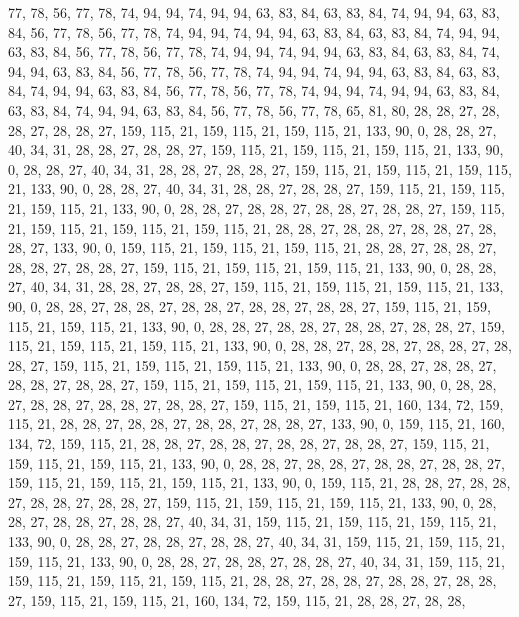 77, 78, 56, 77, 78, 74, 94, 94, 74, 94, 94, 63, 83, 84, 63, 83, 84, 74, 94, 94, 63, 83, 84, 56, 77, 78, 56, 77, 78, 74, 94, 94, 74, 94, 94, 63, 83, 84, 63, 83, 84, 74, 94, 94, 63, 83, 84, 56, 77, 78, 56, 77, 78, 74, 94, 94, 74, 94, 94, 63, 83, 84, 63, 83,
84, 74, 94, 94, 63, 83, 84, 56, 77, 78, 56, 77, 78, 74, 94, 94, 74, 94, 94, 63, 83, 84, 63, 83, 84, 74, 94, 94, 63, 83, 84, 56, 77, 78, 56, 77, 78, 74, 94, 94, 74, 94, 94, 63, 83, 84, 63, 83, 84, 74, 94, 94, 63, 83, 84, 56, 77, 78, 56, 77, 78, 65, 81, 80,
28, 28, 27, 28, 28, 27, 28, 28, 27, 159, 115, 21, 159, 115, 21, 159, 115, 21, 133, 90, 0, 28, 28, 27, 40, 34, 31, 28, 28, 27, 28, 28, 27, 159, 115, 21, 159, 115, 21, 159, 115, 21, 133, 90, 0, 28, 28, 27, 40, 34, 31, 28, 28, 27, 28, 28, 27, 159, 115, 21, 159, 115, 21, 159,
115, 21, 133, 90, 0, 28, 28, 27, 40, 34, 31, 28, 28, 27, 28, 28, 27, 159, 115, 21, 159, 115, 21, 159, 115, 21, 133, 90, 0, 28, 28, 27, 28, 28, 27, 28, 28, 27, 28, 28, 27, 159, 115, 21, 159, 115, 21, 159, 115, 21, 159, 115, 21, 28, 28, 27, 28, 28, 27, 28, 28, 27, 28, 28,
27, 133, 90, 0, 159, 115, 21, 159, 115, 21, 159, 115, 21, 28, 28, 27, 28, 28, 27, 28, 28, 27, 28, 28, 27, 159, 115, 21, 159, 115, 21, 159, 115, 21, 133, 90, 0, 28, 28, 27, 40, 34, 31, 28, 28, 27, 28, 28, 27, 159, 115, 21, 159, 115, 21, 159, 115, 21, 133, 90, 0, 28, 28, 27,
28, 28, 27, 28, 28, 27, 28, 28, 27, 28, 28, 27, 159, 115, 21, 159, 115, 21, 159, 115, 21, 133, 90, 0, 28, 28, 27, 28, 28, 27, 28, 28, 27, 28, 28, 27, 159, 115, 21, 159, 115, 21, 159, 115, 21, 133, 90, 0, 28, 28, 27, 28, 28, 27, 28, 28, 27, 28, 28, 27, 159, 115, 21, 159,
115, 21, 159, 115, 21, 133, 90, 0, 28, 28, 27, 28, 28, 27, 28, 28, 27, 28, 28, 27, 159, 115, 21, 159, 115, 21, 159, 115, 21, 133, 90, 0, 28, 28, 27, 28, 28, 27, 28, 28, 27, 28, 28, 27, 159, 115, 21, 159, 115, 21, 160, 134, 72, 159, 115, 21, 28, 28, 27, 28, 28, 27, 28, 28,
27, 28, 28, 27, 133, 90, 0, 159, 115, 21, 160, 134, 72, 159, 115, 21, 28, 28, 27, 28, 28, 27, 28, 28, 27, 28, 28, 27, 159, 115, 21, 159, 115, 21, 159, 115, 21, 133, 90, 0, 28, 28, 27, 28, 28, 27, 28, 28, 27, 28, 28, 27, 159, 115, 21, 159, 115, 21, 159, 115, 21, 133, 90, 0,
159, 115, 21, 28, 28, 27, 28, 28, 27, 28, 28, 27, 28, 28, 27, 159, 115, 21, 159, 115, 21, 159, 115, 21, 133, 90, 0, 28, 28, 27, 28, 28, 27, 28, 28, 27, 40, 34, 31, 159, 115, 21, 159, 115, 21, 159, 115, 21, 133, 90, 0, 28, 28, 27, 28, 28, 27, 28, 28, 27, 40, 34, 31, 159,
115, 21, 159, 115, 21, 159, 115, 21, 133, 90, 0, 28, 28, 27, 28, 28, 27, 28, 28, 27, 40, 34, 31, 159, 115, 21, 159, 115, 21, 159, 115, 21, 159, 115, 21, 28, 28, 27, 28, 28, 27, 28, 28, 27, 28, 28, 27, 159, 115, 21, 159, 115, 21, 160, 134, 72, 159, 115, 21, 28, 28, 27, 28, 28,

